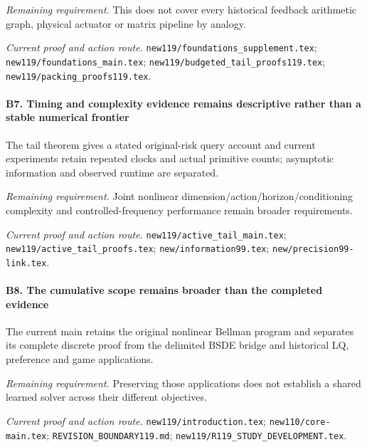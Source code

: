 \par\emph{Remaining requirement.} This does not cover every historical feedback arithmetic graph, physical actuator or matrix pipeline by analogy.

\par\emph{Current proof and action route.} \nolinkurl{new119/foundations_supplement.tex}; \nolinkurl{new119/foundations_main.tex}; \nolinkurl{new119/budgeted_tail_proofs119.tex}; \nolinkurl{new119/packing_proofs119.tex}.

\paragraph{B7. Timing and complexity evidence remains descriptive rather than a stable numerical frontier}

The tail theorem gives a stated original-risk query account and current experiments retain repeated clocks and actual primitive counts; asymptotic information and observed runtime are separated.

\par\emph{Remaining requirement.} Joint nonlinear dimension/\allowbreak{}action/\allowbreak{}horizon/\allowbreak{}conditioning complexity and controlled-frequency performance remain broader requirements.

\par\emph{Current proof and action route.} \nolinkurl{new119/active_tail_main.tex}; \nolinkurl{new119/active_tail_proofs.tex}; \nolinkurl{new/information99.tex}; \nolinkurl{new/precision99-link.tex}.

\paragraph{B8. The cumulative scope remains broader than the completed evidence}

The current main retains the original nonlinear Bellman program and separates its complete discrete proof from the delimited BSDE bridge and historical LQ, preference and game applications.

\par\emph{Remaining requirement.} Preserving those applications does not establish a shared learned solver across their different objectives.

\par\emph{Current proof and action route.} \nolinkurl{new119/introduction.tex}; \nolinkurl{new110/core-main.tex}; \nolinkurl{REVISION_BOUNDARY119.md}; \nolinkurl{new119/R119_STUDY_DEVELOPMENT.tex}.

